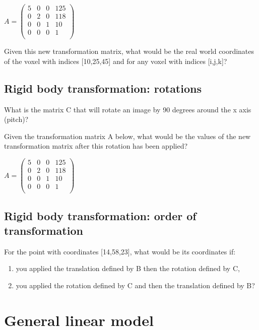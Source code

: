 \documentclass[a4paper,10pt]{article}
\begin{document}
\bigskip
$ A =
\left(\begin{array}{cccc}
  5 	& 0 	& 0 	& 125\\ 
  0 	& 2 	& 0 	& 118\\
  0 	& 0 	& 1 	& 10\\
  0 	& 0 	& 0 	& 1\\
\end{array}\right) 
$
\bigskip

Given this new transformation matrix, what would be the real world 
coordinates of the voxel with indices [10,25,45] and for any voxel with 
indices [i,j,k]?

\subsection{Rigid body transformation: rotations}

What is the matrix C that will rotate an image by 90 degrees around the x axis 
(pitch)? 

Given the transformation matrix A below, what would be the values of the new 
transformation matrix after this rotation has been applied?

\bigskip
$ A =
\left(\begin{array}{cccc}
  5 	& 0 	& 0 	& 125\\ 
  0 	& 2 	& 0 	& 118\\
  0 	& 0 	& 1 	& 10\\
  0 	& 0 	& 0 	& 1\\
\end{array}\right) 
$
\bigskip

\subsection{Rigid body transformation: order of transformation}

For the point with coordinates [14,58,23], what would be its coordinates if:
\begin{enumerate}
  \item you applied the translation defined by B then the rotation defined by C,
  \item you applied the rotation defined by C and then the translation defined 
by B?
\end{enumerate}


\section{General linear model}
\end{document}
